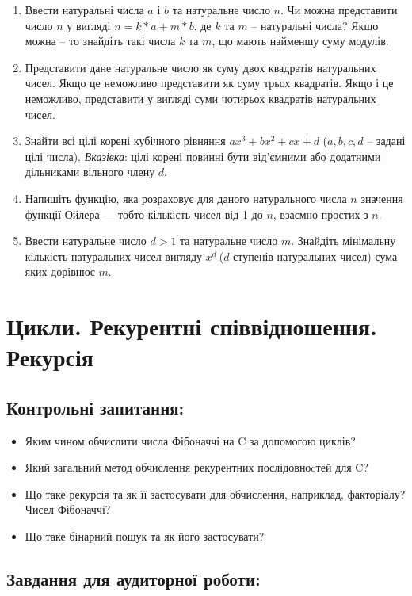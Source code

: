 \documentclass[a5paper,titlepage,openany,twoside,draft]{book_unv}%
\begin{document}
\begin{enumerate}
\def\labelenumi{\arabic{enumi})}
\setcounter{enumi}{26}
\item
  Ввести натуральні числа $a$ і $b$ та натуральне число $n$. Чи можна
  представити число $n$ у вигляді $n= k*a + m*b$, де $k$ та $m$ -- натуральні
  числа? Якщо можна -- то знайдіть такі числа $k$ та $m$, що мають найменшу
  суму модулів.
\item
  Представити дане натуральне число як суму двох квадратів натуральних
  чисел. Якщо це неможливо представити як суму трьох квадратів. Якщо і
  це неможливо, представити у вигляді суми чотирьох квадратів
  натуральних чисел.
\item
  Знайти всі цілі корені кубічного рівняння $ax^3 + bx^2 + cx + d$ ($a,b,c,d$ 
-- задані цілі числа). \emph{Вказівка}: цілі корені повинні бути від'ємними
 або додатними дільниками вільного члену $d$.
\item
  Напишіть функцію, яка розраховує для даного натурального числа $n$
  значення функції Ойлера --- тобто кількість чисел від 1 до $n$, взаємно простих з
  $n$.
\item
  Ввести натуральне число \(d > 1\) та натуральне число $m$. Знайдіть
  мінімальну кількість натуральних чисел вигляду \(x^{d}\ \)(\(d\)-ступенів
  натуральних чисел) сума яких дорівнює $m$.
\end{enumerate}


\chapter{Цикли. Рекурентні співвідношення. Рекурсія }
%

\section{Контрольні запитання:}
\begin{itemize}
\item
  Яким чином обчислити числа Фібоначчі на C за допомогою циклів?
\item
  Який загальний метод обчислення рекурентних послідовноcтей для C?
\item
  Що таке рекурсія та як її застосувати для обчислення, наприклад,
  факторіалу? Чисел Фібоначчі?
\item
  Що таке бінарний пошук та як його застосувати?
\end{itemize}

\section{Завдання для аудиторної роботи:}
\end{document}
